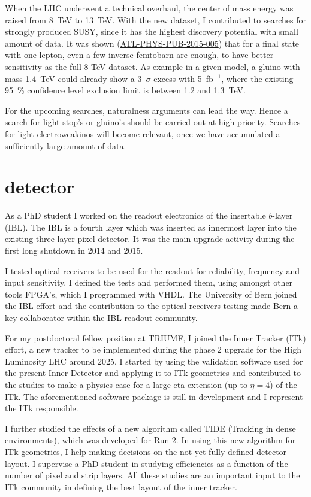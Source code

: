 \documentclass[]{cv} %
\begin{document}
\begin{statement}
When the LHC underwent a technical overhaul, the center of mass energy was
raised from 8~TeV to 13~TeV. With the new dataset, I contributed to searches for
strongly produced SUSY, since it has the highest discovery potential with small
amount of data. It was shown
(\href{https://cds.cern.ch/record/2002608/}{ATL-PHYS-PUB-2015-005}) that for a
final state with one lepton, even a few inverse femtobarn are enough, to have
better sensitivity as the full 8 TeV dataset. As example in a given model, a
gluino with mass 1.4~TeV could already show a 3~$\sigma$ excess with
5~fb$^{-1}$, where the existing 95~\% confidence level exclusion limit is
between 1.2 and 1.3~TeV.

For the upcoming searches, naturalness arguments can lead the way. Hence a
search for light stop's or gluino's should be carried out at high priority.
Searches for light electroweakinos will become relevant, once we have
accumulated a sufficiently large amount of data.

\section{detector}

As a PhD student I worked on the readout electronics of the insertable $b$-layer
(IBL). The IBL is a fourth layer which was inserted as innermost layer into the
existing three layer pixel detector. It was the main upgrade activity during the
first long shutdown in 2014 and 2015.

I tested optical receivers to be used for the readout for reliability, frequency
and input sensitivity. I defined the tests and performed them, using amongst
other tools FPGA's, which I programmed with VHDL. The University of Bern joined
the IBL effort and the contribution to the optical receivers testing made Bern a
key collaborator within the IBL readout community.

For my postdoctoral fellow position at TRIUMF, I joined the Inner Tracker (ITk)
effort, a new tracker to be implemented during the phase 2 upgrade for the High
Luminosity LHC around 2025. I started by using the validation software used for
the present Inner Detector and applying it to ITk geometries and contributed to
the studies to make a physics case for a large eta extension (up to $\eta = 4$)
of the ITk. The aforementioned software package is still in development and I
represent the ITk responsible.

I further studied the effects of a new algorithm called TIDE (Tracking in dense
environments), which was developed for Run-2. In using this new algorithm for
ITk geometries, I help making decisions on the not yet fully defined detector
layout. I supervise a PhD student in studying efficiencies as a function of the
number of pixel and strip layers. All these studies are an important input to
the ITk community in defining the best layout of the inner tracker.

\end{statement}
\fi
\end{document}
